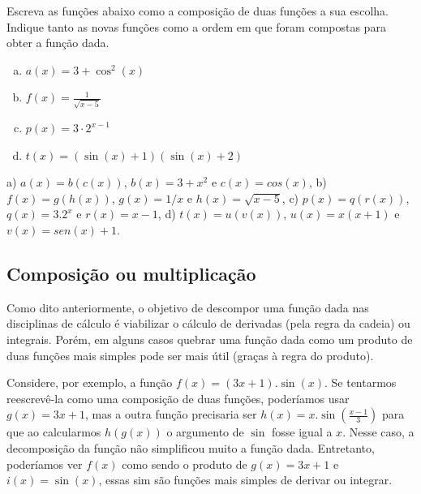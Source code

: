 \documentclass[main.tex]{subfiles}
\begin{document}
\begin{questao}
Escreva as funções abaixo como a composição de duas funções a sua escolha. Indique tanto as novas funções como a ordem em que foram compostas para obter a função dada.
\begin{enumerate}[a)]
\item $a(x)=3+\cos^2(x)$
\item $f(x)=\frac{1}{\sqrt{x-5}}$
\item $p(x)=3 \cdot 2^{x-1}$
\item $t(x)=(\sin(x)+1)(\sin(x)+2)$
\end{enumerate}
\end{questao}


\begin{gabarito}
	\begin{gabaritoQuestao}
		a) $a(x)=b(c(x))$, $b(x)=3+x^2$ e $c(x)=cos(x)$, b) $f(x)=g(h(x))$, $g(x)=1/x$ e $h(x)=\sqrt{x-5}$, c) $p(x)=q(r(x))$, $q(x)=3.2^x$ e $r(x)=x-1$, d) $t(x)=u(v(x))$, $u(x)=x(x+1)$ e $v(x)=sen(x)+1$.
	\end{gabaritoQuestao}
\end{gabarito}

\subsection*{Composição ou multiplicação}

Como dito anteriormente, o objetivo de descompor uma função dada nas disciplinas de cálculo é viabilizar o cálculo de derivadas (pela regra da cadeia) ou integrais. Porém, em alguns casos quebrar uma função dada como um produto de duas funções mais simples pode ser mais útil (graças à regra do produto).

Considere, por exemplo, a função $f(x)=(3x+1).\sin(x)$. Se tentarmos reescrevê-la como uma composição de duas funções, poderíamos usar $g(x)=3x+1$, mas a outra função precisaria ser $h(x)=x.\sin(\frac{x-1}{3})$ para que ao calcularmos $h(g(x))$ o argumento de $\sin$ fosse igual a $x$. Nesse caso, a decomposição da função não simplificou muito a função dada. Entretanto, poderíamos ver $f(x)$ como sendo o produto de $g(x)=3x+1$ e $i(x)=\sin(x)$, essas sim são funções mais simples de derivar ou integrar.
\end{document}

